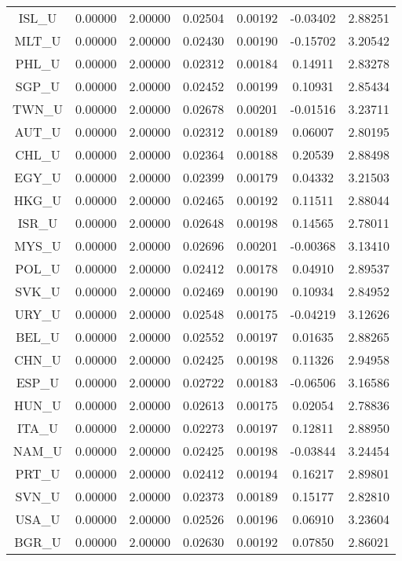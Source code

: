 \begin{longtable}{c c c c c c c}
ISL_U & 0.00000 & 2.00000 & 0.02504 & 0.00192 & -0.03402 & 2.88251 \\
MLT_U & 0.00000 & 2.00000 & 0.02430 & 0.00190 & -0.15702 & 3.20542 \\
PHL_U & 0.00000 & 2.00000 & 0.02312 & 0.00184 & 0.14911 & 2.83278 \\
SGP_U & 0.00000 & 2.00000 & 0.02452 & 0.00199 & 0.10931 & 2.85434 \\
TWN_U & 0.00000 & 2.00000 & 0.02678 & 0.00201 & -0.01516 & 3.23711 \\
AUT_U & 0.00000 & 2.00000 & 0.02312 & 0.00189 & 0.06007 & 2.80195 \\
CHL_U & 0.00000 & 2.00000 & 0.02364 & 0.00188 & 0.20539 & 2.88498 \\
EGY_U & 0.00000 & 2.00000 & 0.02399 & 0.00179 & 0.04332 & 3.21503 \\
HKG_U & 0.00000 & 2.00000 & 0.02465 & 0.00192 & 0.11511 & 2.88044 \\
ISR_U & 0.00000 & 2.00000 & 0.02648 & 0.00198 & 0.14565 & 2.78011 \\
MYS_U & 0.00000 & 2.00000 & 0.02696 & 0.00201 & -0.00368 & 3.13410 \\
POL_U & 0.00000 & 2.00000 & 0.02412 & 0.00178 & 0.04910 & 2.89537 \\
SVK_U & 0.00000 & 2.00000 & 0.02469 & 0.00190 & 0.10934 & 2.84952 \\
URY_U & 0.00000 & 2.00000 & 0.02548 & 0.00175 & -0.04219 & 3.12626 \\
BEL_U & 0.00000 & 2.00000 & 0.02552 & 0.00197 & 0.01635 & 2.88265 \\
CHN_U & 0.00000 & 2.00000 & 0.02425 & 0.00198 & 0.11326 & 2.94958 \\
ESP_U & 0.00000 & 2.00000 & 0.02722 & 0.00183 & -0.06506 & 3.16586 \\
HUN_U & 0.00000 & 2.00000 & 0.02613 & 0.00175 & 0.02054 & 2.78836 \\
ITA_U & 0.00000 & 2.00000 & 0.02273 & 0.00197 & 0.12811 & 2.88950 \\
NAM_U & 0.00000 & 2.00000 & 0.02425 & 0.00198 & -0.03844 & 3.24454 \\
PRT_U & 0.00000 & 2.00000 & 0.02412 & 0.00194 & 0.16217 & 2.89801 \\
SVN_U & 0.00000 & 2.00000 & 0.02373 & 0.00189 & 0.15177 & 2.82810 \\
USA_U & 0.00000 & 2.00000 & 0.02526 & 0.00196 & 0.06910 & 3.23604 \\
BGR_U & 0.00000 & 2.00000 & 0.02630 & 0.00192 & 0.07850 & 2.86021 \\

\end{longtable}
